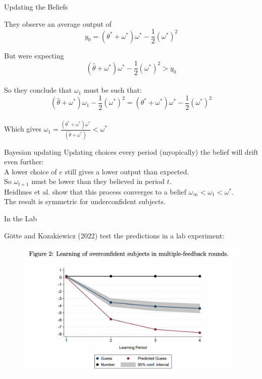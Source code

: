 \documentclass[aspectratio=169]{beamer}
\begin{document}
\begin{frame}{Updating the Beliefs}

They observe an average output of 
$$ y_0=(\theta^* + \omega^*)\omega^*-\frac{1}{2}(\omega^*)^2 $$

But were expecting
$$ (\hat\theta + \omega^*)\omega^*-\frac{1}{2}(\omega^*)^2 > y_0$$\\
\bigskip
\pause
So they conclude that $\omega_1$ must be such that:
$$(\hat \theta + \omega^*)\omega_1-\frac{1}{2}(\omega^*)^2 = (\theta^* + \omega^*)\omega^*-\frac{1}{2}(\omega^*)^2 $$\\
\bigskip 
Which gives $\omega_1 = \frac{(\theta^* + \omega^*)\omega^*}{(\hat \theta + \omega^*)}<\omega^*$
    
\end{frame}

\begin{frame}{Bayesian updating}
    Updating choices every period (myopically) the belief will drift even further:\\
    \bigskip
    A lower choice of $e$ still gives a lower output than expected. \\
    \bigskip
    So $\omega_{t+1}$ must be lower than they believed in period $t$.\\
    \bigskip
    Heidhues et al. show that this process converges to a belief $\omega_\infty<\omega_1<\omega^*.$\\
    \bigskip
    The result is symmetric for underconfident subjects.
    
\end{frame}

\begin{frame}{In the Lab}

Götte and Kozakiewicz (2022) test the predictions in a lab experiment:

\begin{figure}
    \centering
    \includegraphics[scale=0.7]{figures/GK_experiment.png}
\end{figure}
    
\end{frame}
\end{document}
